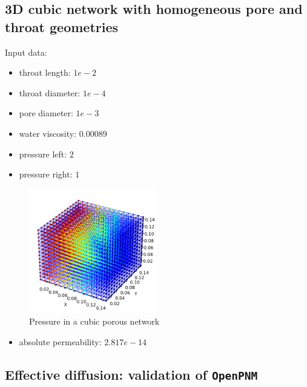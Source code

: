 \documentclass{article}
\begin{document}
\subsection{3D cubic network with homogeneous pore and throat geometries}
Input data:
\begin{itemize}
    \item throat length: $1e-2$
    \item throat diameter: $1e-4$
    \item pore diameter: $1e-3$
    \item water viscosity: $0.00089$
    \item pressure left: $2$
    \item pressure right: $1$
\end{itemize}
\begin{figure}[h]
    \centering
    \includegraphics[width=0.5\textwidth]{images/3DcubicPoreNet.png}
    \caption{Pressure in a cubic porous network}
    \label{fig:3DcubicPN}
\end{figure}
\begin{itemize}
    \item absolute permeability: $2.817e-14$
\end{itemize}

\FloatBarrier  %
\subsection{Effective diffusion: validation of \texttt{OpenPNM}}
\end{document}
